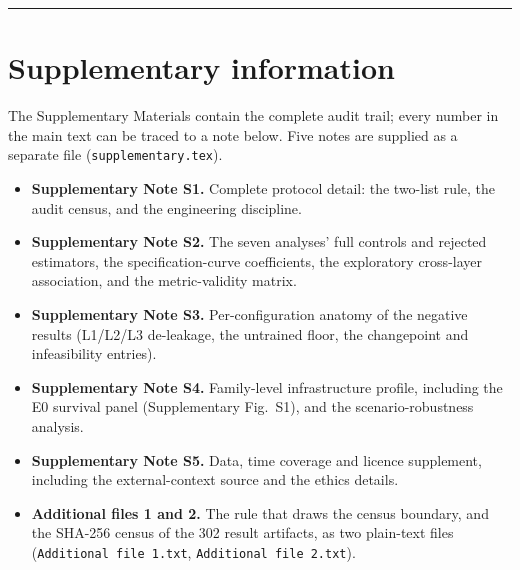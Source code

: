 \documentclass[10pt,a4paper]{article}
\begin{document}
\vspace{4pt}
\hrule
\vspace{6pt}









\bigskip
\section*{Supplementary information}
\noindent The Supplementary Materials contain the complete audit trail; every
number in the main text can be traced to a note below. Five notes are supplied
as a separate file (\texttt{supplementary.tex}).
\begin{itemize}\itemsep0pt
\small
\item \label{sup:S1}\textbf{Supplementary Note S1.} Complete protocol detail:
the two-list rule, the audit census, and the engineering discipline.
\item \label{sup:S2}\textbf{Supplementary Note S2.} The seven analyses' full
controls and rejected estimators, the specification-curve coefficients, the
exploratory cross-layer association, and the metric-validity matrix.
\item \label{sup:S3}\textbf{Supplementary Note S3.} Per-configuration anatomy
of the negative results (L1/L2/L3 de-leakage, the untrained floor, the
changepoint and infeasibility entries).
\item \label{sup:S4}\textbf{Supplementary Note S4.} Family-level
infrastructure profile, including the E0 survival panel (Supplementary
Fig.~S1), and the scenario-robustness analysis.
\item \label{sup:S5}\textbf{Supplementary Note S5.} Data, time coverage and
licence supplement, including the external-context source and the ethics
details.
\item \label{sup:A1A2}\textbf{Additional files 1 and 2.} The rule that draws the
census boundary, and the SHA-256 census of the 302 result artifacts, as two
plain-text files (\texttt{Additional file 1.txt}, \texttt{Additional file 2.txt}).
\end{itemize}



\end{document}
